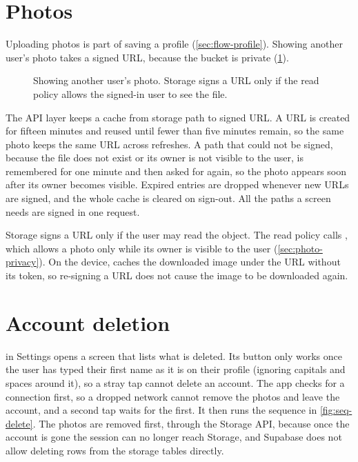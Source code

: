 \section{Photos}
\label{sec:flow-photos}

Uploading photos is part of saving a profile (\cref{sec:flow-profile}). Showing another user's photo
takes a signed URL, because the bucket is private (\cref{fig:seq-photos}).

\begin{figure}[ht]
  \centering
  
  \caption{Showing another user's photo. Storage signs a URL only if the read policy allows the signed-in
    user to see the file.}
  \label{fig:seq-photos}
\end{figure}

The API layer keeps a cache from storage path to signed URL. A URL is created for fifteen minutes and
reused until fewer than five minutes remain, so the same photo keeps the same URL across refreshes. A path that
could not be signed, because the file does not exist or its owner is not visible to the user, is
remembered for one minute and then asked for again, so the photo appears soon after its owner becomes
visible. Expired entries are dropped whenever new URLs are signed, and the whole cache is cleared on
sign-out. All the paths a screen needs are signed in one request.

Storage signs a URL only if the user may read the object. The read policy calls
, which allows a photo only while its owner is visible to the user
(\cref{sec:photo-privacy}). On the device,  caches the downloaded image under the URL
without its token, so re-signing a URL does not cause the image to be downloaded again.

\section{Account deletion}
\label{sec:flow-delete}

 in Settings opens a screen that lists what is deleted. Its 
button only works once the user has typed their first name as it is on their profile (ignoring capitals
and spaces around it), so a stray tap cannot delete an account. The app checks for a connection first,
so a dropped network cannot remove the photos and leave the account, and a second tap waits for the
first. It then runs the sequence in \cref{fig:seq-delete}. The photos are removed first, through the Storage API, because once the account is
gone the session can no longer reach Storage, and Supabase does not allow deleting rows from the storage
tables directly.

